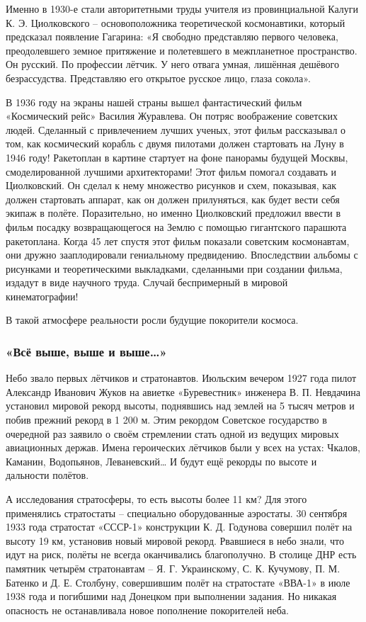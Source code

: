 Именно в 1930-е стали авторитетными труды учителя из провинциальной Калуги К.
Э. Циолковского – основоположника теоретической космонавтики, который
предсказал появление Гагарина: «Я свободно представляю первого человека,
преодолевшего земное притяжение и полетевшего в межпланетное пространство. Он
русский. По профессии лётчик. У него отвага умная, лишённая дешёвого
безрассудства. Представляю его открытое русское лицо, глаза сокола». 

В 1936 году на экраны нашей страны вышел фантастический фильм «Космический
рейс» Василия Журавлева. Он потряс воображение советских людей. Сделанный с
привлечением лучших ученых, этот фильм рассказывал о том, как космический
корабль с двумя пилотами должен стартовать на Луну в 1946 году! Ракетоплан в
картине стартует на фоне панорамы будущей Москвы, смоделированной лучшими
архитекторами! Этот фильм помогал создавать и Циолковский. Он сделал к нему
множество рисунков и схем, показывая, как должен стартовать аппарат, как он
должен прилуняться, как будет вести себя экипаж в полёте. Поразительно, но
именно Циолковский предложил ввести в фильм посадку возвращающегося на Землю с
помощью гигантского парашюта ракетоплана. Когда 45 лет спустя этот фильм
показали советским космонавтам, они дружно зааплодировали гениальному
предвидению. Впоследствии альбомы с рисунками и теоретическими выкладками,
сделанными при создании фильма, издадут в виде научного труда. Случай
беспримерный в мировой кинематографии!

В такой атмосфере реальности росли будущие покорители космоса.

\subsubsection{«Всё выше, выше и выше…»}

Небо звало первых лётчиков и стратонавтов. Июльским вечером 1927 года пилот
Александр Иванович Жуков на авиетке «Буревестник» инженера В. П. Невдачина
установил мировой рекорд высоты, поднявшись над землей на 5 тысяч метров и
побив прежний рекорд в 1 200 м. Этим рекордом Советское государство в очередной
раз заявило о своём стремлении стать одной из ведущих мировых авиационных
держав. Имена героических лётчиков были у всех на устах: Чкалов, Каманин,
Водопьянов, Леваневский… И будут ещё рекорды по высоте и дальности полётов.

А исследования стратосферы, то есть высоты более 11 км? Для этого применялись стратостаты – специально оборудованные аэростаты. 30 сентября 1933 года стратостат «СССР-1» конструкции К. Д. Годунова совершил полёт на высоту 19 км, установив новый мировой рекорд. Рвавшиеся в небо знали, что идут на риск, полёты не всегда оканчивались благополучно. В столице ДНР есть памятник четырём стратонавтам – Я. Г. Украинскому, С. К. Кучумову, П. М. Батенко и Д. Е. Столбуну, совершившим полёт на стратостате «ВВА-1» в июле 1938 года и погибшими над Донецком при выполнении задания. Но никакая опасность не останавливала новое пополнение покорителей неба.

